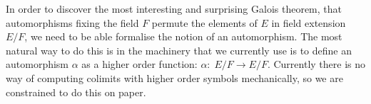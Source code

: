 In order to discover the most interesting and surprising Galois
theorem, that automorphisms fixing the field $F$ permute the elements
of $E$ in field extension $E/F$, we need to be able formalise the
notion of an automorphism. The most natural way to do this is in the
machinery that we currently use is to define an automorphism $\alpha$
as a higher order function: $\alpha:\; E/F \to E/F$. Currently there
is no way of computing colimits with higher order symbols
mechanically, so we are constrained to do this on paper.

